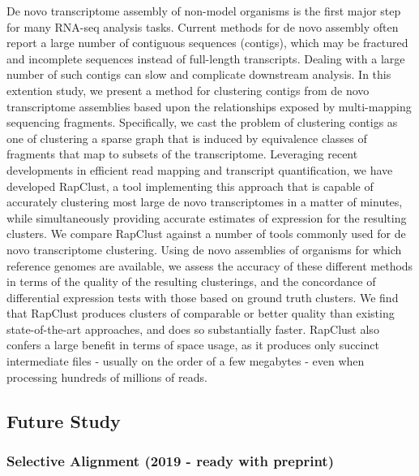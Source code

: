 De novo transcriptome assembly of non-model organisms is the first major step for many 
RNA-seq analysis tasks. Current methods for de novo assembly often report a large number 
of contiguous sequences (contigs), which may be fractured and incomplete sequences 
instead of full-length transcripts. Dealing with a large number of such contigs can 
slow and complicate downstream analysis. In this extention study, we present a method 
for clustering contigs from de novo transcriptome assemblies based upon the relationships 
exposed by multi-mapping sequencing fragments. Specifically, we cast the problem of 
clustering contigs as one of clustering a sparse graph that is induced by equivalence 
classes of fragments that map to subsets of the transcriptome. Leveraging recent developments 
in efficient read mapping and transcript quantification, we have developed RapClust, a tool 
implementing this approach that is capable of accurately clustering most large de novo 
transcriptomes in a matter of minutes, while simultaneously providing accurate estimates of 
expression for the resulting clusters. We compare RapClust against a number of tools commonly 
used for de novo transcriptome clustering. Using de novo assemblies of organisms for which 
reference genomes are available, we assess the accuracy of these different methods in terms of 
the quality of the resulting clusterings, and the concordance of differential expression tests 
with those based on ground truth clusters. We find that RapClust produces clusters of comparable 
or better quality than existing state-of-the-art approaches, and does so substantially faster. 
RapClust also confers a large benefit in terms of space usage, as it produces only succinct 
intermediate files - usually on the order of a few megabytes - even when processing hundreds 
of millions of reads.

\subsection{Future Study}
\subsubsection{Selective Alignment (2019 - ready with preprint)}

